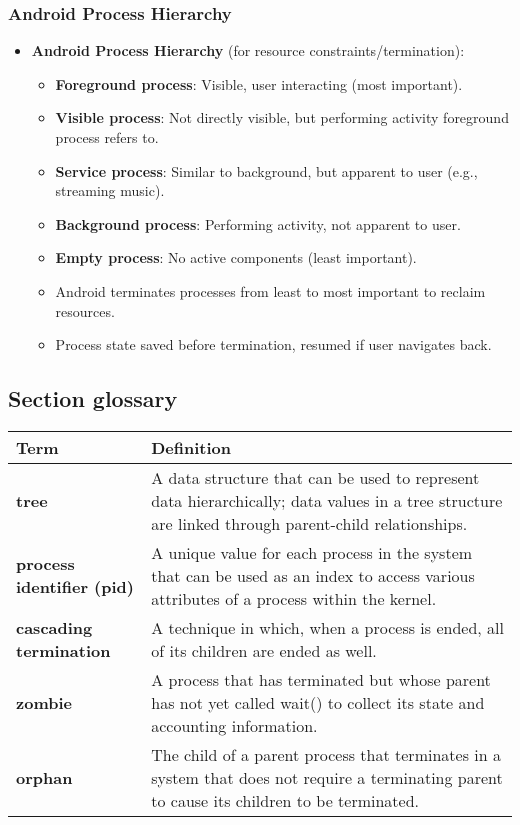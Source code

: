 \subsubsection{Android Process Hierarchy}
\begin{itemize}
    \item \textbf{Android Process Hierarchy} (for resource constraints/termination):
        \begin{itemize}
            \item \textbf{Foreground process}: Visible, user interacting (most important).
            \item \textbf{Visible process}: Not directly visible, but performing activity foreground process refers to.
            \item \textbf{Service process}: Similar to background, but apparent to user (e.g., streaming music).
            \item \textbf{Background process}: Performing activity, not apparent to user.
            \item \textbf{Empty process}: No active components (least important).
            \item Android terminates processes from least to most important to reclaim resources.
            \item Process state saved before termination, resumed if user navigates back.
        \end{itemize}
\end{itemize}
\subsection*{Section glossary}
\centering
\begin{tabular}{>{\raggedright}p{} >{\raggedright\arraybackslash}p{}}
\toprule
\textbf{Term} & \textbf{Definition} \\
\midrule
\textbf{tree} & A data structure that can be used to represent data hierarchically; data values in a tree structure are linked through parent-child relationships. \\
\textbf{process identifier (pid)} & A unique value for each process in the system that can be used as an index to access various attributes of a process within the kernel. \\
\textbf{cascading termination} & A technique in which, when a process is ended, all of its children are ended as well. \\
\textbf{zombie} & A process that has terminated but whose parent has not yet called wait() to collect its state and accounting information. \\
\textbf{orphan} & The child of a parent process that terminates in a system that does not require a terminating parent to cause its children to be terminated. \\
\bottomrule
\end{tabular}
\vspace{\baselineskip}
